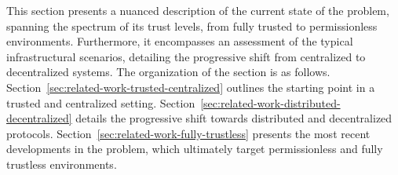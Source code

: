 This section presents a nuanced description of the current state of the \pol{} problem, spanning the spectrum of its trust levels, from fully trusted to permissionless environments. Furthermore, it encompasses an assessment of the typical infrastructural scenarios, detailing the progressive shift from centralized to decentralized systems. The organization of the section is as follows. Section~\ref{sec:related-work-trusted-centralized} outlines the starting point in a trusted and centralized setting. Section~\ref{sec:related-work-distributed-decentralized} details the progressive shift towards distributed and decentralized protocols. Section~\ref{sec:related-work-fully-trustless} presents the most recent developments in the \pol{} problem, which ultimately target permissionless and fully trustless environments.











